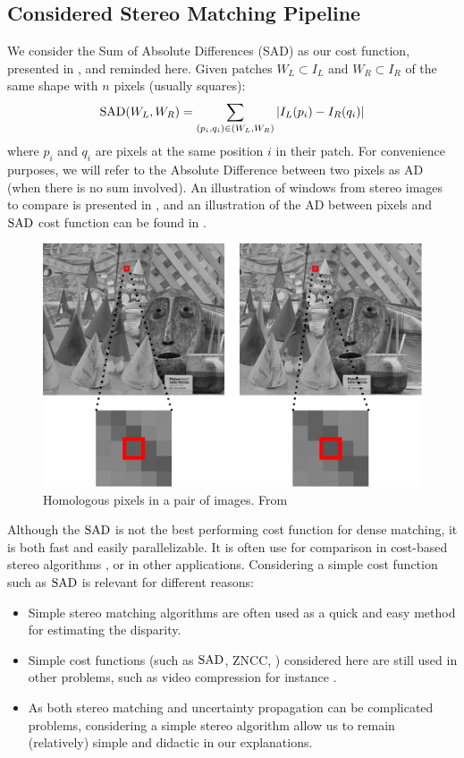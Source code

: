 \subsection{Considered Stereo Matching Pipeline}
We consider the Sum of Absolute Differences (SAD) as our cost function, presented in , and reminded here. Given patches $W_L\subset I_L$ and $W_R\subset I_R$ of the same shape with $n$ pixels (usually squares):
\begin{align}
    \mathrm{SAD}(W_L, W_R) = \sum_{(p_i, q_i)\in (W_L, W_R)}|I_L(p_i) - I_R(q_i)|\label{eq:SAD}
\end{align}
where $p_i$ and $q_i$ are pixels at the same position $i$ in their patch. For convenience purposes, we will refer to the Absolute Difference between two pixels as AD (when there is no sum involved). An illustration of windows from stereo images to compare is presented in , and an illustration of the AD between pixels and $\mathrm{SAD}$ cost function can be found in .

\begin{figure}[ht]
  \centering
  \includegraphics[width=0.8\linewidth]{Images/Chap_4/Cones.png}
  \caption{Homologous pixels in a pair of images. From \cite{malinowski_uncertainty_2024}}\label{fig:Cones}
\end{figure}

\begin{remark}
    Although the $\mathrm{SAD}$ is not the best performing cost function for dense matching, it is both fast and easily parallelizable. It is often use for comparison in cost-based stereo algorithms \cite{hirschmuller_evaluation_2007, zbontar_stereo_2016}, or in other applications. Considering a simple cost function such as $\mathrm{SAD}$ is relevant for different reasons:
    \begin{itemize}
        \item Simple stereo matching algorithms are often used as a quick and easy method for estimating the disparity.
        \item Simple cost functions (such as $\mathrm{SAD}$, ZNCC, \etc) considered here are still used in other problems, such as video compression for instance \cite{richardson_h264_2006}.
        \item As both stereo matching and uncertainty propagation can be complicated problems, considering a simple stereo algorithm allow us to remain (relatively) simple and didactic in our explanations. 
    \end{itemize}
\end{remark}

